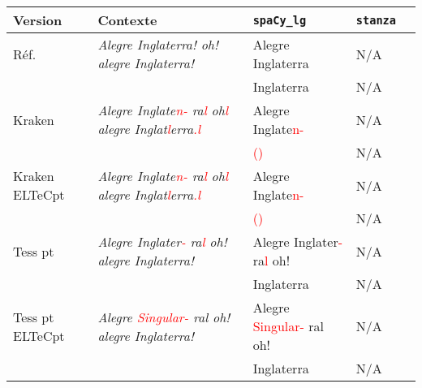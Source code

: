 \begin{tabular}{|l|p{4cm}|l|l|l|}
\hline
\bf{Version} & \bf {Contexte} & \bf{\texttt{spaCy\_lg}}&\bf{\texttt{stanza}}\\
\hline
Réf.\ & \textit{Alegre Inglaterra! oh! alegre Inglaterra!} &Alegre Inglaterra &  N/A\\
&  &Inglaterra &  N/A\\
\hline
 Kraken &\textit{Alegre Inglate\textcolor{red}{n- }ra\textcolor{red}{l} oh\textcolor{red}{l} alegre Inglat\textcolor{red}{l}erra\textcolor{red}{.l}} &Alegre Inglate\textcolor{red}{n-} &  N/A\\
& &\textcolor{red}{()}&  N/A\\ 
\hline
Kraken ELTeCpt  &\textit{Alegre Inglate\textcolor{red}{n- }ra\textcolor{red}{l} oh\textcolor{red}{l} alegre Inglat\textcolor{red}{l}erra\textcolor{red}{.l}} &Alegre Inglate\textcolor{red}{n-}   & N/A \\
& &  \textcolor{red}{()}& N/A \\
\hline
Tess pt  &\textit{Alegre Inglater\textcolor{red}{-} ra\textcolor{red}{l} oh! alegre Inglaterra!} & Alegre Inglater\textcolor{red}{-} ra\textcolor{red}{l} oh! & N/A \\
& & Inglaterra & N/A \\
\hline
Tess pt ELTeCpt  & \textit{Alegre \textcolor{red}{Singular-} ral oh! alegre Inglaterra!}&Alegre \textcolor{red}{Singular-} ral oh!&N/A\\
& & Inglaterra & N/A \\

\hline
\end{tabular}

